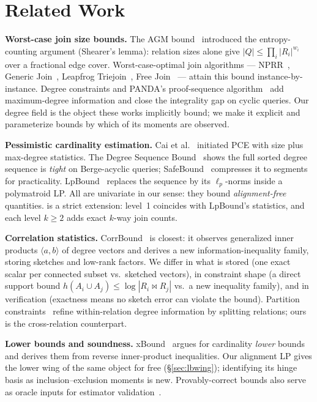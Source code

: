 \section{Related Work}
\label{sec:related}

\textbf{Worst-case join size bounds.}
The AGM bound~\cite{atserias2013size,atserias2008agm} introduced the
entropy-counting argument (Shearer's lemma): relation sizes alone give
$|Q| \le \prod_i |R_i|^{w_i}$ over a fractional edge cover.
Worst-case-optimal join algorithms --- NPRR~\cite{ngo2012worst},
Generic Join~\cite{ngo2014skew}, Leapfrog
Triejoin~\cite{veldhuizen2014leapfrog}, Free
Join~\cite{wang2023freejoin} --- attain this bound instance-by-instance.
Degree constraints and PANDA's proof-sequence
algorithm~\cite{abokhamis2017panda} add maximum-degree information and
close the integrality gap on cyclic queries.  Our degree field is the
object these works implicitly bound; we make it explicit and
parameterize bounds by which of its moments are observed.

\textbf{Pessimistic cardinality estimation.}
Cai et al.~\cite{cai2019pessimistic} initiated PCE with size plus
max-degree statistics.  The Degree Sequence
Bound~\cite{deeds2023degree} shows the full sorted degree sequence is
\emph{tight} on Berge-acyclic queries; SafeBound~\cite{deeds2023safebound}
compresses it to segments for practicality.  LpBound~\cite{abokhamis2024lp,
zhang2025lpbound} replaces the sequence by its $\ell_p$-norms inside a
polymatroid LP.  All are univariate in our sense: they bound
\emph{alignment-free} quantities.  \framework{} is a strict extension:
level~1 coincides with LpBound's statistics, and each level $k\ge2$
adds exact $k$-way join counts.

\textbf{Correlation statistics.}
CorrBound~\cite{mayer2026corrbound} is closest: it observes
generalized inner products $\langle a,b\rangle$ of degree vectors and
derives a new information-inequality family, storing sketches and
low-rank factors.  We differ in what is stored (one exact scalar per
connected subset vs.\ sketched vectors), in constraint shape (a direct
support bound $h(A_i\cup A_j) \le \log|R_i\Join R_j|$ vs.\ a new
inequality family), and in verification (exactness means no sketch
error can violate the bound).  Partition
constraints~\cite{deeds2025partition} refine within-relation degree
information by splitting relations; ours is the cross-relation
counterpart.

\textbf{Lower bounds and soundness.}
xBound~\cite{stoian2026xbound} argues for cardinality \emph{lower}
bounds and derives them from reverse inner-product inequalities.  Our
alignment LP gives the lower wing of the same object for free
(\S\ref{sec:lbwing}); identifying its hinge basis as
inclusion--exclusion moments is new.  Provably-correct bounds also
serve as oracle inputs for estimator
validation~\cite{stoian2026outofbounds}.

